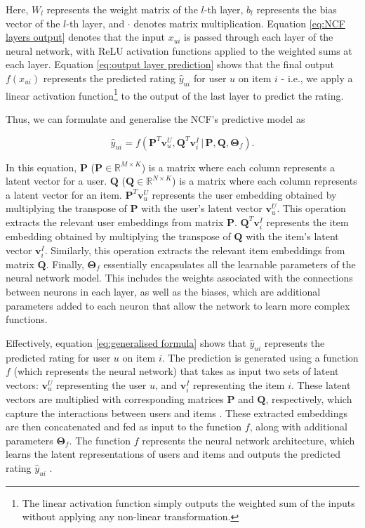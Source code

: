 Here, $W_l$ represents the weight matrix of the $l$-th layer, $b_l$ represents the bias vector of the $l$-th layer, and $\cdot$ denotes matrix multiplication. Equation \ref{eq:NCF layers output} denotes that the input $x_{ui}$ is passed through each layer of the neural network, with ReLU activation functions applied to the weighted sums at each layer. Equation \ref{eq:output layer prediction} shows that the final output $f\left(x_{ui}\right)$ represents the predicted rating $\hat{y}_{ui}$ for user $u$ on item $i$ - i.e., we apply a linear activation function\footnote{The linear activation function simply outputs the weighted sum of the inputs without applying any non-linear transformation.} to the output of the last layer to predict the rating.


Thus, we can formulate and generalise the NCF’s predictive model as


\begin{equation}
    \label{eq:generalised formula}
    \hat{y}_{ui} = f\left(\mathbf{P}^T \mathbf{v}_u^U, \mathbf{Q}^T \mathbf{v}_i^I \,|\, \mathbf{P}, \mathbf{Q}, \boldsymbol{\Theta}_f\right).
\end{equation}
    
In this equation, $\mathbf{P}$ ($\mathbf{P} \in \mathbb{R}^{M \times K}$) is a matrix where each column represents a latent vector for a user. $\mathbf{Q}$ ($\mathbf{Q} \in \mathbb{R}^{N \times K}$) is a matrix where each column represents a latent vector for an item. $\mathbf{P}^T \mathbf{v}_u^U$ represents the user embedding obtained by multiplying the transpose of $\mathbf{P}$ with the user's latent vector $\mathbf{v}_u^U$. This operation extracts the relevant user embeddings from matrix $\mathbf{P}$.
$\mathbf{Q}^T \mathbf{v}_i^I$ represents the item embedding obtained by multiplying the transpose of $\mathbf{Q}$ with the item's latent vector $\mathbf{v}_i^I$. Similarly, this operation extracts the relevant item embeddings from matrix $\mathbf{Q}$. Finally, $\boldsymbol{\Theta}_f$ essentially encapsulates all the learnable parameters of the neural network model. This includes the weights associated with the connections between neurons in each layer, as well as the biases, which are additional parameters added to each neuron that allow the network to learn more complex functions. 
 
Effectively, equation \ref{eq:generalised formula} shows that $\hat{y}_{ui}$ represents the predicted rating for user $u$ on item $i$. The prediction is generated using a function $f$ (which represents the neural network) that takes as input two sets of latent vectors: $\mathbf{v}_u^U$ representing the user $u$, and $\mathbf{v}_i^I$ representing the item $i$. These latent vectors are multiplied with corresponding matrices $\mathbf{P}$ and $\mathbf{Q}$, respectively, which capture the interactions between users and items \cite{he2017neural}. These extracted embeddings are then concatenated and fed as input to the function $f$, along with additional parameters $\boldsymbol{\Theta}_f$. The function $f$ represents the neural network architecture, which learns the latent representations of users and items and outputs the predicted rating $\hat{y}_{ui}$ \cite{he2017neural}.

